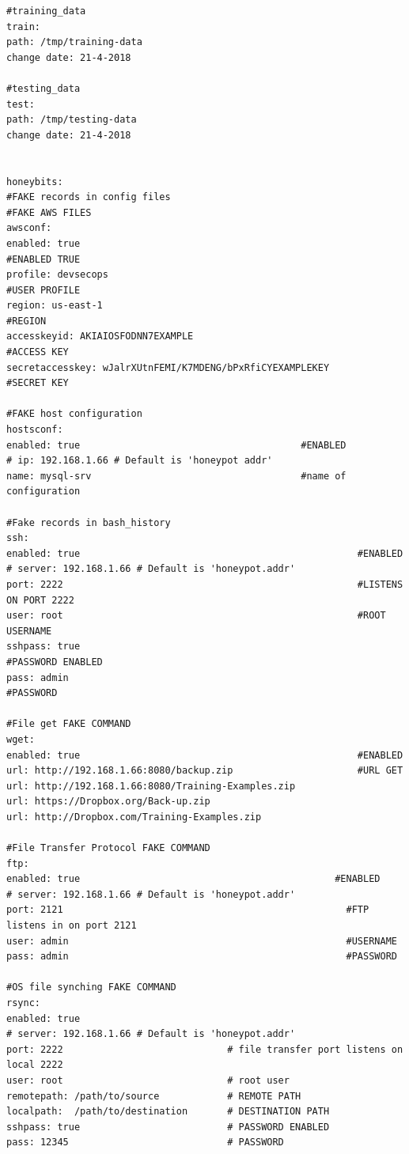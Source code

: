 \documentclass[grad,lot,lof,11pt,oneside,onehalfspace]{RUthesis}
\begin{document}
\begin{lstlisting}
#training_data
train:
path: /tmp/training-data
change date: 21-4-2018

#testing_data
test:
path: /tmp/testing-data
change date: 21-4-2018


honeybits:
#FAKE records in config files
#FAKE AWS FILES
awsconf:
enabled: true                                                         #ENABLED TRUE
profile: devsecops                                                    #USER PROFILE
region: us-east-1                                                     #REGION
accesskeyid: AKIAIOSFODNN7EXAMPLE                                     #ACCESS KEY
secretaccesskey: wJalrXUtnFEMI/K7MDENG/bPxRfiCYEXAMPLEKEY             #SECRET KEY

#FAKE host configuration
hostsconf:
enabled: true                                       #ENABLED
# ip: 192.168.1.66 # Default is 'honeypot addr'
name: mysql-srv                                     #name of configuration

#Fake records in bash_history
ssh:
enabled: true                                                 #ENABLED
# server: 192.168.1.66 # Default is 'honeypot.addr'
port: 2222                                                    #LISTENS ON PORT 2222
user: root                                                    #ROOT USERNAME
sshpass: true                                                 #PASSWORD ENABLED
pass: admin                                                    #PASSWORD

#File get FAKE COMMAND
wget:
enabled: true                                                 #ENABLED
url: http://192.168.1.66:8080/backup.zip                      #URL GET
url: http://192.168.1.66:8080/Training-Examples.zip
url: https://Dropbox.org/Back-up.zip
url: http://Dropbox.com/Training-Examples.zip

#File Transfer Protocol FAKE COMMAND
ftp:
enabled: true                                             #ENABLED
# server: 192.168.1.66 # Default is 'honeypot.addr'
port: 2121                                                  #FTP listens in on port 2121
user: admin                                                 #USERNAME
pass: admin                                                 #PASSWORD

#OS file synching FAKE COMMAND
rsync:
enabled: true
# server: 192.168.1.66 # Default is 'honeypot.addr'
port: 2222                             # file transfer port listens on local 2222
user: root                             # root user
remotepath: /path/to/source            # REMOTE PATH
localpath:  /path/to/destination       # DESTINATION PATH
sshpass: true                          # PASSWORD ENABLED
pass: 12345                            # PASSWORD


\end{lstlisting}
\end{document}
